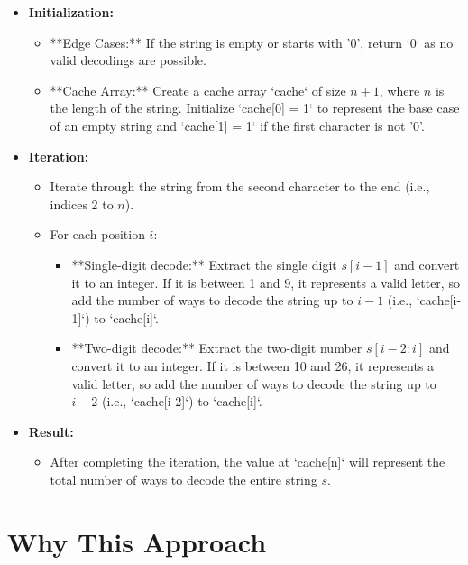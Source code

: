 \begin{itemize}
    \item \textbf{Initialization:}
    \begin{itemize}
        \item **Edge Cases:** If the string is empty or starts with '0', return `0` as no valid decodings are possible.
        \item **Cache Array:** Create a cache array `cache` of size \( n + 1 \), where \( n \) is the length of the string. Initialize `cache[0] = 1` to represent the base case of an empty string and `cache[1] = 1` if the first character is not '0'.
    \end{itemize}
    
    \item \textbf{Iteration:}
    \begin{itemize}
        \item Iterate through the string from the second character to the end (i.e., indices 2 to \( n \)).
        \item For each position \( i \):
        \begin{itemize}
            \item **Single-digit decode:** Extract the single digit \( s[i-1] \) and convert it to an integer. If it is between 1 and 9, it represents a valid letter, so add the number of ways to decode the string up to \( i-1 \) (i.e., `cache[i-1]`) to `cache[i]`.
            \item **Two-digit decode:** Extract the two-digit number \( s[i-2:i] \) and convert it to an integer. If it is between 10 and 26, it represents a valid letter, so add the number of ways to decode the string up to \( i-2 \) (i.e., `cache[i-2]`) to `cache[i]`.
        \end{itemize}
    \end{itemize}
    
    \item \textbf{Result:}
    \begin{itemize}
        \item After completing the iteration, the value at `cache[n]` will represent the total number of ways to decode the entire string \( s \).
    \end{itemize}
\end{itemize}

\section*{Why This Approach}

